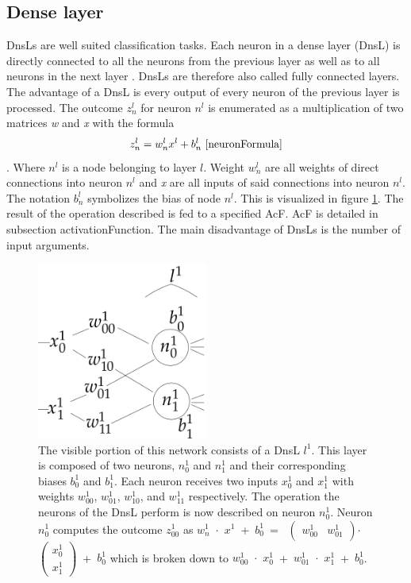 \subsection{Dense layer}\label{denseLayers}
DnsLs are well suited classification tasks. Each neuron in a dense layer (DnsL) is directly connected to all the neurons from the previous layer as well as to all neurons in the next layer \cite{CNN}. DnsLs are therefore also called fully connected layers. The advantage of a DnsL is every output of every neuron of the previous layer is processed. The outcome ${z^l_n}$ for neuron ${n^l}$  is enumerated as a multiplication of two matrices \textit{w} and \textit{x} with the formula \[{z^l_{n}}=w^l_n  x^l + b^l_n~\cite{neuronFormula}\]. Where ${n^l}$ is a node belonging to layer ${l}$. Weight ${w^l_n}$ are all weights of direct connections into neuron ${n^l}$ and \textit{x} are all inputs of said connections into neuron ${n^l}$. The notation ${b^l_n}$ symbolizes the bias of node ${n^l}$. This is visualized in figure \ref{denseLayerVisualization}. The result of the operation described is fed to a specified AcF. AcF is detailed in subsection {activationFunction}. The main disadvantage of DnsLs is the number of input arguments.
\begin{figure}
  \includegraphics[width=0.5\textwidth]{Images/denseLayer.png}
  \caption[rightcaption]{The visible portion of this network consists of a DnsL ${l^1}$. This layer is composed of two neurons, ${n^1_0}$ and ${n^1_1}$ and their corresponding biases ${b^1_0}$ and ${b^1_1}$. Each neuron receives two inputs ${x^1_{0}}$ and ${x^1_{1}}$ with weights ${w^1_{00}}$, ${w^1_{01}}$, ${w^1_{10}}$, and ${w^1_{11}}$ respectively. The operation the neurons of the DnsL perform is now described on neuron ${n^1_{0}}$. Neuron ${n^1_{0}}$ computes the outcome ${z^1_{00}}$ as 
${w^1_{n}}$~$\cdot$~${x^1}$~+~${b^1_0}$~=~
 $\left(\begin{smallmatrix}{w^1_{00}}&{w^1_{01}}\end{smallmatrix}\right)$$\cdot$$\left(\begin{smallmatrix}{x^1_{0}}\\{x^1_{1}}\end{smallmatrix}\right)$~+~${b^1_0}$
which is broken down to ${w^1_{00}}$~$\cdot$~${x^1_{0}}$~+~${w^1_{01}}$~$\cdot$~${x^1_{1}}$~+~${b^1_0}$.
}
  \label{denseLayerVisualization}
\end{figure} 


